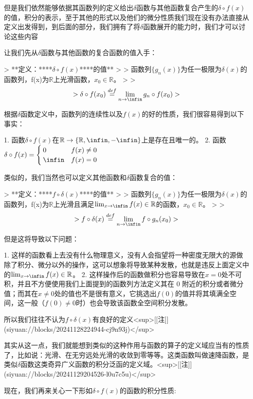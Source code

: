 \documentclass[lang=cn,10pt,newtx,bibend=biber,device=pad]{elegantbook}
\begin{document}
但是我们依然能够依据其函数列的定义给出$\delta$函数与其他函数复合产生的$\delta\circ f(x)$的值，积分的表示，至于其他的形式以及他们的微分性质我们现在没有办法直接从定义出发得到，到后面的部分，我们拥有了将$\delta$函数展开的能力时，我们才可以讨论这些内容

让我们先从$\delta$函数与其他函数的复合函数的值入手：

> **定义：**​**$\delta\circ f(x)$**​**的值**
>
> 函数列$\{g_n(x)\}$为任一极限为$\delta(x)$的函数列，f(x)为$\mathbb{R}$上光滑函数，$x_0\in \mathbb{R}$。
>
> $$
> \delta\circ f(x_0) \overset{def}{=} \lim_{n\rightarrow\infin} g_n\circ f(x_0)
> $$

根据$\delta$函数定义中，函数列的连续性以及$f(x)$的好的性质，我们很容易得到以下事实：

1. 函数$\delta\circ f(x)$在$\mathbb{R}\rightarrow\{\mathbb{R},\infin,-\infin\}$上是存在且唯一的。
2. 函数$\delta\circ f(x) =  \begin{cases} 0&f(x)\neq 0\\ \infin &f(x)=0 \end{cases}$

类似的，我们当然也可以定义其他函数和$\delta$函数复合的值：

> **定义：**​**$f\circ \delta(x)$**​**的值**
>
> 函数列$\{g_n(x)\}$为任一极限为$\delta(x)$的函数列，f(x)为$\mathbb{R}$上光滑且满足$\lim_{x\rightarrow\infin}f(x)\in\mathbb{R}$的函数，$x_0\in \mathbb{R}$。
>
> $$
> f\circ \delta(x) \overset{def}{=} \lim_{n\rightarrow\infin} f\circ g_n(x_0)
> $$

但是这将导致以下问题：

1. 这样的函数看上去没有什么物理意义，没有人会指望将一种密度无限大的源做除了积分、微分以外的操作，这可以想象将导致某种发散，也就是违反上面定义中的$\lim_{x\rightarrow\infin}f(x)\in\mathbb{R}$。
2. 这样操作后的函数做积分也容易导致在$x=0$处不可积，并且不方便使用我们上面提到的函数列方法定义其在 0 附近的积分或者微分值；而其在$x\neq 0$处的值也不是很有意义，它挑选出$f(0)$的值并将其填满全空间，这一般（$f(0)\neq 0$时）也会导致该函数全空间积分发散。

所以我们往往不认为$f\circ \delta(x)$有良好的定义<sup>[[注]](siyuan://blocks/20241128224944-cj9n93j)</sup>

其实从这一点，我们就能想到类似的这种作用与函数的算子的定义域应当有的性质了，比如说：光滑、在无穷远处光滑的收敛到零等等。这类函数叫做速降函数，是类似$\delta$函数这类奇异广义函数的积分泛函的定义域。<sup>[[注]](siyuan://blocks/20241129204526-l0u7c5u)</sup>

现在，我们再来关心一下形如$\delta\circ f(x)$的函数的积分性质:
\end{document}
